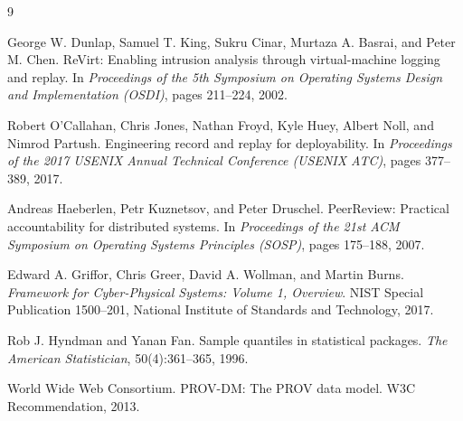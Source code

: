 \documentclass[11pt]{article}
\begin{document}
\begin{thebibliography}{9}

George W. Dunlap, Samuel T. King, Sukru Cinar, Murtaza A. Basrai, and Peter M. Chen.
\newblock ReVirt: Enabling intrusion analysis through virtual-machine logging and replay.
\newblock In \emph{Proceedings of the 5th Symposium on Operating Systems Design and Implementation (OSDI)}, pages 211--224, 2002.

Robert O'Callahan, Chris Jones, Nathan Froyd, Kyle Huey, Albert Noll, and Nimrod Partush.
\newblock Engineering record and replay for deployability.
\newblock In \emph{Proceedings of the 2017 USENIX Annual Technical Conference (USENIX ATC)}, pages 377--389, 2017.

Andreas Haeberlen, Petr Kuznetsov, and Peter Druschel.
\newblock PeerReview: Practical accountability for distributed systems.
\newblock In \emph{Proceedings of the 21st ACM Symposium on Operating Systems Principles (SOSP)}, pages 175--188, 2007.

Edward A. Griffor, Chris Greer, David A. Wollman, and Martin Burns.
\newblock \emph{Framework for Cyber-Physical Systems: Volume 1, Overview}.
\newblock NIST Special Publication 1500--201, National Institute of Standards and Technology, 2017.

Rob J. Hyndman and Yanan Fan.
\newblock Sample quantiles in statistical packages.
\newblock \emph{The American Statistician}, 50(4):361--365, 1996.

World Wide Web Consortium.
\newblock PROV-DM: The PROV data model.
\newblock W3C Recommendation, 2013.

\end{thebibliography}
\end{document}
